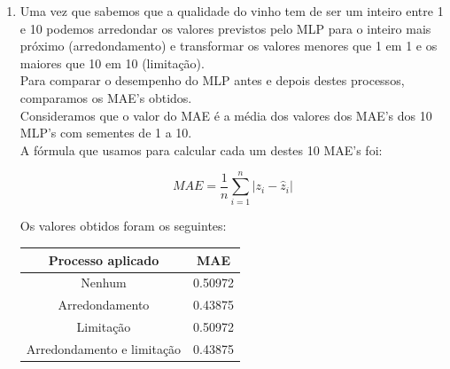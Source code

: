 \documentclass[a4paper,12pt]{article} %
\begin{document}
\begin{enumerate}
\begin{lstlisting}[language=Python]
# Training Test Split
variables_train, variables_test, target_train, target_test= train_test_split(variables, target, 
                                                                            train_size=0.8, random_state=0)

######### Exercise 1 ##########
residues = np.array([])

for i in range(1, 11):
    # Learn the MLP regressor 
    mlp = MLPRegressor(hidden_layer_sizes=(10,10), activation='relu', early_stopping=True, validation_fraction=0.2, random_state=i)
    #Predict output
    y_pred = mlp.fit(variables_train,target_train).predict(variables_test)
    #Calculate residues
    residue = abs(target_test - y_pred)
    residue = residue.to_numpy()
    residues = np.append(residues, residue)
    
#Plot all the residues
plt.hist(residues, edgecolor='black',bins='auto')
plt.title('Histogram of the residues')
plt.xlabel('Residues')
plt.ylabel('Frequency')
plt.savefig('ex1_histogram.png')
plt.show()
    
\end{lstlisting}

\item Uma vez que sabemos que a qualidade do vinho tem de ser um inteiro entre 
1 e 10 podemos arredondar os valores previstos pelo MLP para o inteiro mais próximo (arredondamento)
e transformar os valores menores que 1 em 1 e os maiores que 10 em 10 (limitação).\\
Para comparar o desempenho do MLP antes e depois destes processos, comparamos os MAE's obtidos. 
\\ Consideramos que o valor do MAE é a média dos valores dos MAE's dos 10 MLP's com sementes de 1 a 10.\\
A fórmula que usamos para calcular cada um destes 10 MAE's foi:

\begin{equation}
    MAE = \frac{1}{n} \sum_{i=1}^{n} | z_i - \hat{z}_i |
\end{equation}

Os valores obtidos foram os seguintes:

\begin{table}[H]
\centering
\begin{tabular}{|c|c|}
\hline
Processo aplicado & MAE \\ \hline
Nenhum & 0.50972 \\ \hline
Arredondamento & 0.43875 \\ \hline
Limitação & 0.50972 \\ \hline
Arredondamento e limitação & 0.43875 \\ \hline
\end{tabular}
\end{table}


\end{enumerate}
\end{document}
